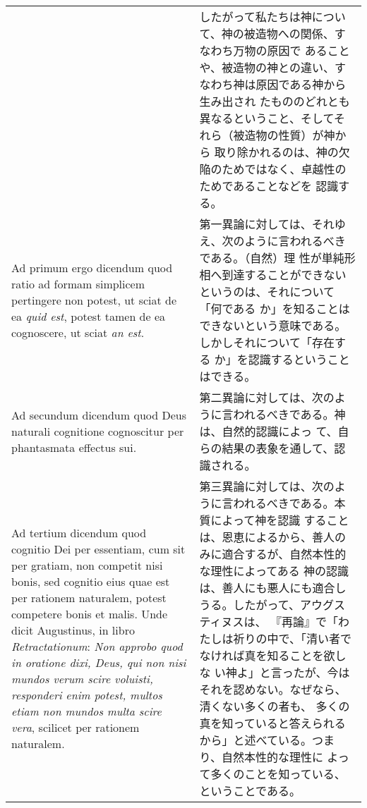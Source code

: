 \documentclass[10pt]{jsarticle} %
\begin{document}
\begin{longtable}{p{21em}p{21em}}
&

したがって私たちは神について、神の被造物への関係、すなわち万物の原因で
あることや、被造物の神との違い、すなわち神は原因である神から生み出され
たもののどれとも異なるということ、そしてそれら（被造物の性質）が神から
取り除かれるのは、神の欠陥のためではなく、卓越性のためであることなどを
認識する。

\\

{\sc Ad primum ergo dicendum} quod ratio ad formam simplicem
pertingere non potest, ut sciat de ea {\it quid est}, potest tamen de
ea cognoscere, ut sciat {\it an est}.

&

第一異論に対しては、それゆえ、次のように言われるべきである。（自然）理
性が単純形相へ到達することができないというのは、それについて「何である
か」を知ることはできないという意味である。しかしそれについて「存在する
か」を認識するということはできる。

\\

{\sc Ad secundum dicendum} quod Deus naturali cognitione cognoscitur
per phantasmata effectus sui.

&

第二異論に対しては、次のように言われるべきである。神は、自然的認識によっ
て、自らの結果の表象を通して、認識される。

\\

{\sc Ad tertium dicendum} quod cognitio Dei per essentiam, cum sit per
gratiam, non competit nisi bonis, sed cognitio eius quae est per
rationem naturalem, potest competere bonis et malis. Unde dicit
Augustinus, in libro {\it Retractationum}: {\it Non approbo quod in
oratione dixi, Deus, qui non nisi mundos verum scire voluisti,
responderi enim potest, multos etiam non mundos multa scire vera},
scilicet per rationem naturalem.

&

第三異論に対しては、次のように言われるべきである。本質によって神を認識
することは、恩恵によるから、善人のみに適合するが、自然本性的な理性によってある
神の認識は、善人にも悪人にも適合しうる。したがって、アウグスティヌスは、
『再論』で「わたしは祈りの中で、「清い者でなければ真を知ることを欲しな
い神よ」と言ったが、今はそれを認めない。なぜなら、清くない多くの者も、
多くの真を知っていると答えられるから」と述べている。つまり、自然本性的な理性に
よって多くのことを知っている、ということである。

\end{longtable}
\end{document}
